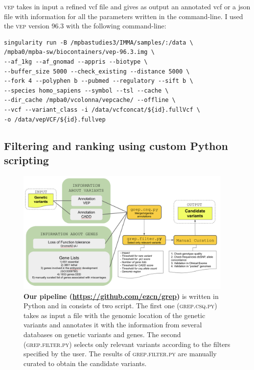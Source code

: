 \textsc{vep} takes in input a refined vcf file and gives as output an annotated vcf or a json file with information for all the parameters written in the command-line. I used the \textsc{vep} version 96.3 with the following command-line: 

\begin{verbatim}
singularity run -B /mpbastudies3/IMMA/samples/:/data \
/mpba0/mpba-sw/biocontainers/vep-96.3.img \
--af_1kg --af_gnomad --appris --biotype \
--buffer_size 5000 --check_existing --distance 5000 \
--fork 4 --polyphen b --pubmed --regulatory --sift b \
--species homo_sapiens --symbol --tsl --cache \
--dir_cache /mpba0/vcolonna/vepcache/ --offline \
--vcf --variant_class -i /data/vcfconcat/${id}.fullVcf \
-o /data/vepVCF/${id}.fullvep
\end{verbatim}

\subsection{Filtering and ranking using custom Python scripting}
    
\begin{figure}[H]
\centering
\includegraphics[width=0.95\textwidth]{fig/pipelineComplete.png}
\decoRule
\caption{\textbf{Our pipeline (\url{https://github.com/ezcn/grep})} is written in Python and in consists of two script. The first one (\textsc{grep.csq.py}) takes as input a file with the genomic location of the genetic variants and annotates it with the information from several databases on genetic variants and genes. The second (\textsc{grep.filter.py}) selects only relevant variants according to the filters specified by the user. The results of \textsc{grep.filter.py} are manually curated to obtain the candidate variants.} 
\label{fig:pipelineComplete}
\end{figure}


